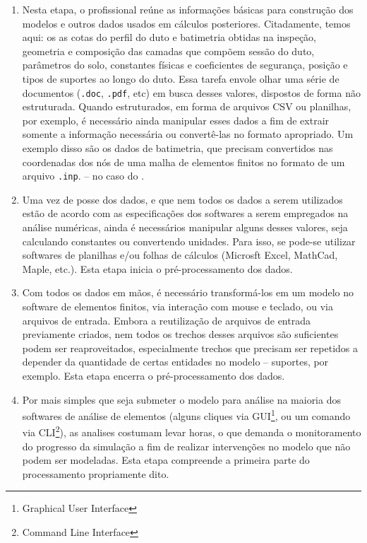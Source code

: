 \begin{enumerate}[label=(\arabic*)]
    \item Nesta etapa, o profissional reúne as informações básicas para construção dos modelos e outros dados usados em cálculos posteriores. Citadamente, temos aqui: os as cotas do perfil do duto e batimetria obtidas na inspeção, geometria e composição das camadas que compõem sessão do duto, parâmetros do solo, constantes físicas e coeficientes de segurança, posição e tipos de suportes ao longo do duto. Essa tarefa envole olhar uma série de documentos (\texttt{.doc}, \texttt{.pdf}, etc) em busca desses valores, dispostos de forma não estruturada. Quando estruturados, em forma de arquivos CSV ou planilhas, por exemplo, é necessário ainda manipular esses dados a fim de extrair somente a informação necessária ou convertê-las no formato apropriado. Um exemplo disso são os dados de batimetria, que precisam convertidos nas coordenadas dos nós de uma malha de elementos finitos no formato de um arquivo \texttt{.inp}. -- no caso do \abaqus.
    \item Uma vez de posse dos dados, e que nem todos os dados a serem utilizados estão de acordo com as especificações dos softwares a serem empregados na análise numéricas, ainda é necessários manipular alguns desses valores, seja calculando constantes ou convertendo unidades. Para isso, se pode-se utilizar softwares de planilhas e/ou folhas de cálculos (Microsft Excel, MathCad, Maple, etc.). Esta etapa inicia o pré-processamento dos dados.
    \item Com todos os dados em mãos, é necessário transformá-los em um modelo no software de elementos finitos, via interação com mouse e teclado, ou via arquivos de entrada. Embora a reutilização de arquivos de entrada previamente criados, nem todos os trechos desses arquivos são suficientes podem ser reaproveitados, especialmente trechos que precisam ser repetidos a depender da quantidade de certas entidades no modelo -- suportes, por exemplo. Esta etapa encerra o pré-processamento dos dados.
    \item Por mais simples que seja submeter o modelo para análise na maioria dos softwares de análise de elementos (alguns cliques via GUI\footnote{Graphical User Interface}, ou um comando via CLI\footnote{Command Line Interface}), as analises costumam levar horas, o que demanda o monitoramento do progresso da simulação a fim de realizar intervenções no modelo que não podem ser modeladas.  Esta etapa compreende a primeira parte do processamento propriamente dito.

\end{enumerate}
